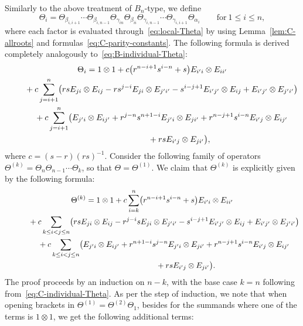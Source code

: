 \documentclass[10pt,a4paper]{amsart}
\numberwithin{equation}{section}
\begin{document}
Similarly to the above treatment of $B_{n}$-type, we define
\begin{displaymath}
 \Theta_{i} = \Theta_{\beta_{i,i + 1}}\cdots \Theta_{\beta_{i,n-1}}
 \Theta_{\gamma_{in}} \Theta_{\beta_{ii}}\Theta_{\gamma_{i,n-1}}\cdots \Theta_{\gamma_{i,i+1}}\Theta_{\alpha_{i}}
 \qquad \mathrm{for} \ 1\leq i\leq n,
\end{displaymath}
where each factor is evaluated through~\eqref{eq:local-Theta} by using Lemma~\ref{lem:C-allroots} and formulas~\eqref{eq:C-parity-constants}.
The following formula is derived completely analogously to~\eqref{eq:B-individual-Theta}:
\begin{gather}
 \Theta_{i} = 1 \otimes 1 + c\bigl(r^{n - i + 1}s^{i - n} + s\bigr) E_{i'i} \otimes E_{ii'} \nonumber\\
 \hphantom{\Theta_{i} =}{}
 + c\sum_{j = i + 1}^{n}\bigl(rsE_{ji} \otimes E_{ij} - rs^{j - i}E_{ji} \otimes E_{j'i'} - s^{i - j + 1}E_{i'j'} \otimes E_{ij} + E_{i'j'} \otimes E_{j'i'}\bigr)\nonumber \\
 \hphantom{\Theta_{i} =}{}
 + c\sum_{j = i + 1}^{n}\bigl(E_{j'i} \otimes E_{ij'} + r^{j - n}s^{n + 1 - i}E_{j'i} \otimes E_{ji'} + r^{n - j + 1}s^{i - n}E_{i'j} \otimes E_{ij'}\nonumber\\
 \hphantom{\Theta_{i} =+ c\sum_{j = i + 1}^{n}\bigl(}{}
 + rsE_{i'j} \otimes E_{ji'}\bigr),\label{eq:C-individual-Theta}
\end{gather}
where $c = (s - r)(rs)^{-1}$. Consider the following family of operators $\Theta^{(k)}=\Theta_n \Theta_{n-1} \cdots \Theta_{k}$, so that $\Theta=\Theta^{(1)}$. We claim that $\Theta^{(k)}$ is explicitly given by the following formula:
\begin{gather}
 \Theta^{(k)} = 1 \otimes 1 + c\sum_{i = k}^{n}\bigl(r^{n - i + 1}s^{i - n} + s\bigr)E_{i'i} \otimes E_{ii'} \nonumber \\
 \hphantom{\Theta^{(k)} =}{}
 + c\sum_{k \le i < j \le n}\bigl(rsE_{ji} \otimes E_{ij} - r^{j - i}sE_{ji} \otimes E_{j'i'} - s^{i - j + 1}E_{i'j'} \otimes E_{ij} + E_{i'j'} \otimes E_{j'i'}\bigr) \nonumber\\
 \hphantom{\Theta^{(k)} =}{}
 + c\sum_{k \le i < j \le n}\bigl(E_{j'i} \otimes E_{ij'} + r^{n + 1 - i}s^{j - n}E_{j'i} \otimes E_{ji'} + r^{n - j + 1}s^{i - n}E_{i'j} \otimes E_{ij'} \nonumber\\
 \hphantom{\Theta^{(k)} = + c\sum_{k \le i < j \le n}\bigl(}{}
 + rsE_{i'j} \otimes E_{ji'}\bigr).\label{eq:C-Theta_k}
\end{gather}
The proof proceeds by an induction on $n-k$, with the base case $k=n$ following from~\eqref{eq:C-individual-Theta}. As per the step of induction, we note that when opening brackets in $\Theta^{(1)}=\Theta^{(2)}\Theta_1$, besides for the summands where one of the terms is $1\otimes 1$, we get the following additional terms:
\end{document}
